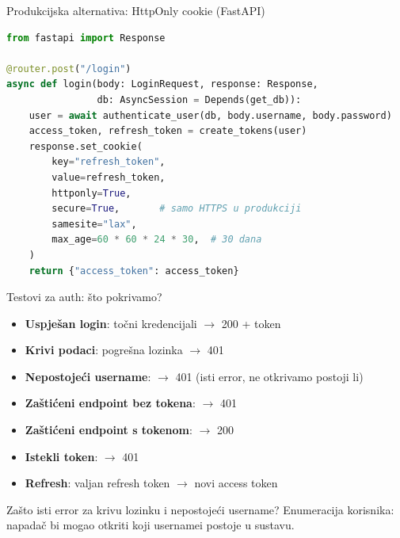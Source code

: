 \begin{frame}[fragile,shrink=5]{Produkcijska alternativa: HttpOnly cookie (FastAPI)}
\begin{lstlisting}[language=python]
from fastapi import Response

@router.post("/login")
async def login(body: LoginRequest, response: Response,
                db: AsyncSession = Depends(get_db)):
    user = await authenticate_user(db, body.username, body.password)
    access_token, refresh_token = create_tokens(user)
    response.set_cookie(
        key="refresh_token",
        value=refresh_token,
        httponly=True,
        secure=True,       # samo HTTPS u produkciji
        samesite="lax",
        max_age=60 * 60 * 24 * 30,  # 30 dana
    )
    return {"access_token": access_token}
\end{lstlisting}
\end{frame}

\begin{frame}{Testovi za auth: što pokrivamo?}
	\begin{itemize}
		\item \textbf{Uspješan login}: točni kredencijali $\rightarrow$ 200 + token
		\item \textbf{Krivi podaci}: pogrešna lozinka $\rightarrow$ 401
		\item \textbf{Nepostojeći username}: $\rightarrow$ 401 (isti error, ne otkrivamo postoji li)
		\item \textbf{Zaštićeni endpoint bez tokena}: $\rightarrow$ 401
		\item \textbf{Zaštićeni endpoint s tokenom}: $\rightarrow$ 200
		\item \textbf{Istekli token}: $\rightarrow$ 401
		\item \textbf{Refresh}: valjan refresh token $\rightarrow$ novi access token
	\end{itemize}

	\vspace{0.6em}
	Zašto isti error za krivu lozinku i nepostojeći username? Enumeracija korisnika: napadač bi mogao otkriti koji usernamei postoje u sustavu.
\end{frame}


